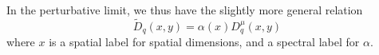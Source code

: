\documentclass[11pt]{article}
\begin{document}
In the perturbative limit, we thus have the slightly more general relation
\begin{equation}
	\tilde{D}_q(x,y) = \alpha(x) D^\mu_q(x,y)
\end{equation}
where $x$ is a spatial label for spatial dimensions, and a spectral label for $\alpha$.
{}

\end{document}
